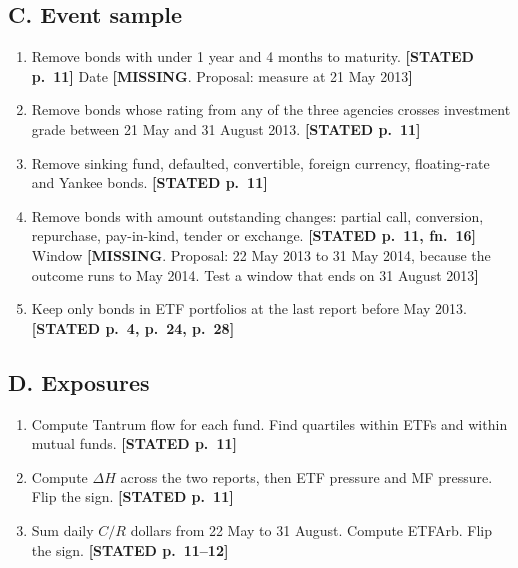 \documentclass[10pt,a4paper]{article}
\newcommand{\ST}[1]{\textcolor{cst}{\textbf{[STATED #1]}}}
\newcommand{\MI}[1]{\textcolor{cmi}{\textbf{[MISSING}. Proposal: #1\textbf{]}}}
\begin{document}
\subsection*{C. Event sample}
\begin{enumerate}[resume]
\item Remove bonds with under 1 year and 4 months to maturity. \ST{p.~11} Date \MI{measure at 21 May 2013}
\item Remove bonds whose rating from any of the three agencies crosses investment grade between 21 May and 31 August 2013. \ST{p.~11}
\item Remove sinking fund, defaulted, convertible, foreign currency, floating-rate and Yankee bonds. \ST{p.~11}
\item Remove bonds with amount outstanding changes: partial call, conversion, repurchase, pay-in-kind, tender or exchange. \ST{p.~11, fn.~16} Window \MI{22 May 2013 to 31 May 2014, because the outcome runs to May 2014. Test a window that ends on 31 August 2013}
\item Keep only bonds in ETF portfolios at the last report before May 2013. \ST{p.~4, p.~24, p.~28}
\end{enumerate}

\subsection*{D. Exposures}
\begin{enumerate}[resume]
\item Compute Tantrum flow for each fund. Find quartiles within ETFs and within mutual funds. \ST{p.~11}
\item Compute $\Delta H$ across the two reports, then ETF pressure and MF pressure. Flip the sign. \ST{p.~11}
\item Sum daily $C/R$ dollars from 22 May to 31 August. Compute ETFArb. Flip the sign. \ST{p.~11--12}
\end{enumerate}
\end{document}
